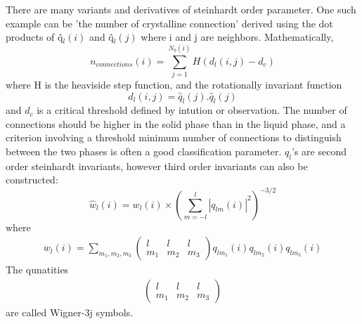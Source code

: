 There are many variants and derivatives of steinhardt order parameter. One such example can be 'the number of crystalline connection'\cite{tenWolde1996} derived using the dot products of 
\^{q}$_l(i)$ and \^{q}$_l(j)$ where i and j are neighbors. Mathematically, 
\[ n_{connections}(i) = \sum_{j=1}^{N_b(i)} H(d_l(i,j) - d_c)\]
where H is the heaviside step function, and the rotationally invariant function 
\[ d_l(i,j) = \hat{q}_l(j) . \hat{q}_l(j)\]
and $d_c$ is a critical threshold defined by intution or observation. The number of connections should be higher in the solid phase than in the liquid
phase, and a criterion involving a threshold minimum number
of connections to distinguish between the two phases is often
a good classification parameter.
$q_l$'s are second order steinhardt invariants, however third order invariants can also be constructed\cite{Lechner2008}:
\[\hat{w}_l(i) = w_l(i) \times (\sum_{m=-l}^l|q_{lm}(i)|^2)^{-3/2}\]
where 
\begin{gather}
  w_l(i) = \sum_{m_1, m_2,m_3} 
  \begin{pmatrix} 
    l & l & l \\
    m_1 & m_2 & m_3
  \end{pmatrix}
  q_{lm_1}(i)q_{lm_2}(i)q_{lm_3}(i)
\end{gather}
The qunatities 
\begin{gather}
  \begin{pmatrix}
    l & l & l \\
    m_1 & m_2 & m_3
  \end{pmatrix} 
\end{gather}
are called Wigner-3j symbols.


